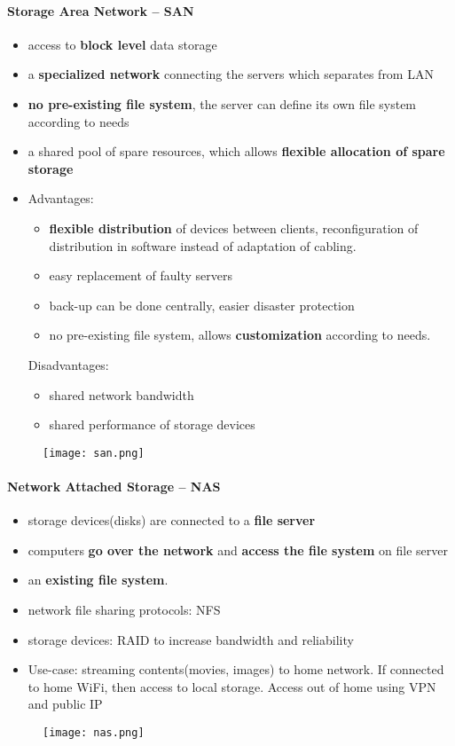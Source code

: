\paragraph{Storage Area Network -- SAN}
\begin{itemize}
	\item access to \textbf{block level} data storage
	\item a \textbf{specialized network} connecting the servers which separates from LAN
	\item \textbf{no pre-existing file system}, the server can define its own file system according to needs
	\item a shared pool of spare resources, which allows \textbf{flexible allocation of spare storage} 
	
	\item Advantages:
	\begin{itemize}
		\item \textbf{flexible distribution} of devices between clients, reconfiguration of distribution in software instead of adaptation of cabling.
		\item easy replacement of faulty servers
		\item back-up can be done centrally, easier disaster protection
		\item no pre-existing file system, allows \textbf{customization} according to needs.
	\end{itemize}
	Disadvantages:
	\begin{itemize}
		\item shared network bandwidth
		\item shared performance of storage devices
	\end{itemize}
\end{itemize}
\begin{figure}[H]
	\centering
	\texttt{[image: san.png]}
\end{figure}

\paragraph{Network Attached Storage -- NAS}
\begin{itemize}
	\item storage devices(disks) are connected to a \textbf{file server}
	\item computers \textbf{go over the network} and \textbf{access the file system} on file server
	\item an \textbf{existing file system}.
	\item network file sharing protocols: NFS
	\item storage devices: RAID to increase bandwidth and reliability
	\item Use-case: streaming contents(movies, images) to home network. If connected to home WiFi, then access to local storage. Access out of home using VPN and public IP
	
\end{itemize}
\begin{figure}[H]
	\centering
	\texttt{[image: nas.png]}
\end{figure}


